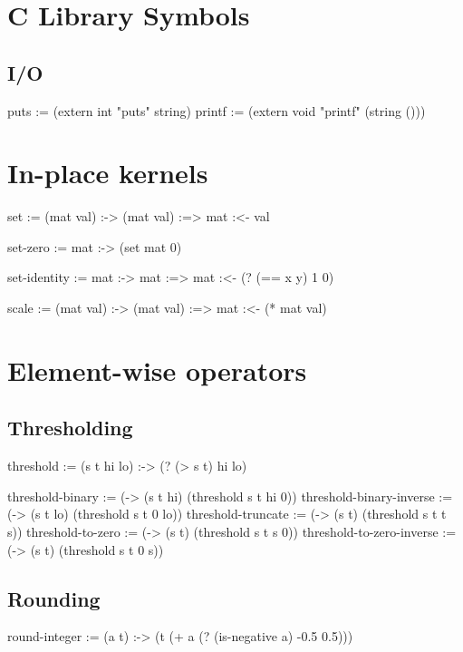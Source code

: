\documentclass[twoside=false, numbers=noenddot]{scrbook}
\newenvironment{likely}
{ \verbatim }
{ \endverbatim }
\begin{document}
\chapter{C Library Symbols}
\section{I/O}
\begin{likely}
puts := (extern int "puts" string)
printf := (extern void "printf" (string ()))
\end{likely}

\chapter{In-place kernels}
\begin{likely}
set :=
  (mat val) :->
    (mat val) :=>
      mat :<- val

set-zero :=
  mat :->
    (set mat 0)

set-identity :=
  mat :->
    mat :=>
      mat :<- (? (== x y) 1 0)

scale :=
  (mat val) :->
    (mat val) :=>
      mat :<- (* mat val)
\end{likely}

\chapter{Element-wise operators}
\section{Thresholding}
\begin{likely}
threshold :=
  (s t hi lo) :->
    (? (> s t) hi lo)

threshold-binary          := (-> (s t hi) (threshold s t hi 0))
threshold-binary-inverse  := (-> (s t lo) (threshold s t 0  lo))
threshold-truncate        := (-> (s t)    (threshold s t t  s))
threshold-to-zero         := (-> (s t)    (threshold s t s  0))
threshold-to-zero-inverse := (-> (s t)    (threshold s t 0  s))
\end{likely}

\section{Rounding}
\begin{likely}
round-integer :=
  (a t) :->
    (t (+ a (? (is-negative a) -0.5 0.5)))
\end{likely}
\end{document}
